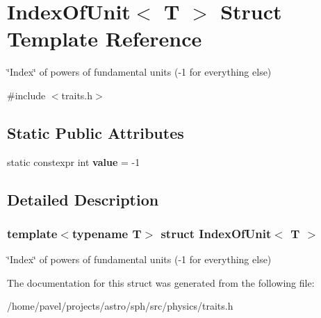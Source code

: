 \hypertarget{structIndexOfUnit}{}\section{Index\+Of\+Unit$<$ T $>$ Struct Template Reference}
\label{structIndexOfUnit}


\char`\"{}\+Index\char`\"{} of powers of fundamental units (-\/1 for everything else)  




{\ttfamily \#include $<$traits.\+h$>$}

\subsection*{Static Public Attributes}
\begin{DoxyCompactItemize}
\item 
\hypertarget{structIndexOfUnit_a16702416c6de796ddf71d2220b3d8ff3}{}\label{structIndexOfUnit_a16702416c6de796ddf71d2220b3d8ff3} 
static constexpr int {\bfseries value} = -\/1
\end{DoxyCompactItemize}


\subsection{Detailed Description}
\subsubsection*{template$<$typename T$>$\newline
struct Index\+Of\+Unit$<$ T $>$}

\char`\"{}\+Index\char`\"{} of powers of fundamental units (-\/1 for everything else) 

The documentation for this struct was generated from the following file\+:\begin{DoxyCompactItemize}
\item 
/home/pavel/projects/astro/sph/src/physics/traits.\+h\end{DoxyCompactItemize}
